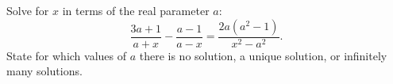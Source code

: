 Solve for $x$ in terms of the real parameter $a$:
\[
\dfrac{3a+1}{a+x}-\dfrac{a-1}{a-x}=\dfrac{2a(a^2-1)}{x^2-a^2}.
\]
State for which values of $a$ there is no solution, a unique solution, or infinitely many solutions.
